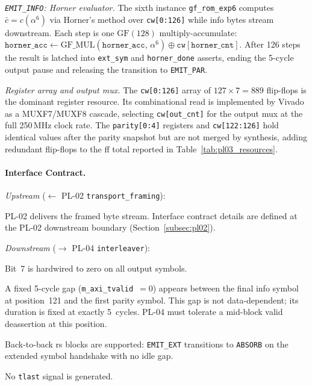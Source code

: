 \textit{\texttt{EMIT\_INFO}: Horner evaluator.}
The sixth instance \texttt{gf\_rom\_exp6} computes
$\bar{c} = c(\alpha^6)$ via Horner's method over \texttt{cw[0:126]}
while info bytes stream downstream.
Each step is one $\mathrm{GF}(128)$ multiply-accumulate:
$\mathtt{horner\_acc} \leftarrow
\mathrm{GF\_MUL}(\mathtt{horner\_acc},\,\alpha^6) \oplus
\mathtt{cw[horner\_cnt]}$.
After 126 steps the result is latched into \texttt{ext\_sym} and
\texttt{horner\_done} asserts, ending the 5-cycle output pause and
releasing the transition to \texttt{EMIT\_PAR}.

\textit{Register array and output mux.}
The \texttt{cw[0:126]} array of $127 \times 7 = 889$ flip-flops is the
dominant register resource.
Its combinational read is implemented by Vivado as a MUXF7/MUXF8
cascade, selecting \texttt{cw[out\_cnt]} for the output mux at the
full 250\,MHz clock rate.
The \texttt{parity[0:4]} registers and \texttt{cw[122:126]} hold
identical values after the parity snapshot but are not merged by
synthesis, adding redundant flip-flops to the \ac{ff} total reported
in Table~\ref{tab:pl03_resources}.


\FloatBarrier
\paragraph{Interface Contract.}

\textit{Upstream} ($\leftarrow$ PL-02 \texttt{transport\_framing}):
\begin{tightemize}
  \item PL-02 delivers the framed byte stream. Interface contract
        details are defined at the PL-02 downstream boundary
        (Section~\ref{subsec:pl02}).
\end{tightemize}

\textit{Downstream} ($\rightarrow$ PL-04 \texttt{interleaver}):
\begin{tightemize}
  \item Bit~7 is hardwired to zero on all output symbols.
  \item A fixed 5-cycle gap (\texttt{m\_axi\_tvalid}~$= 0$) appears
        between the final info symbol at position~121 and the first
        parity symbol.
        This gap is not data-dependent; its duration is fixed at
        exactly 5~cycles.
        PL-04 must tolerate a mid-block valid deassertion at this
        position.
  \item Back-to-back \ac{rs} blocks are supported:
        \texttt{EMIT\_EXT} transitions to \texttt{ABSORB} on the
        extended symbol handshake with no idle gap.
  \item No \texttt{tlast} signal is generated.
\end{tightemize}

